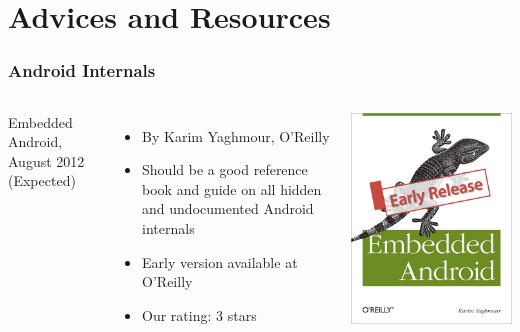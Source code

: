 \section{Advices and Resources}

\begin{frame}
  \frametitle{Android Internals}
  \begin{columns}
    Embedded Android, August 2012 (Expected)
    \begin{itemize}
    \item By Karim Yaghmour, O'Reilly
    \item Should be a good reference book and guide on all hidden and
      undocumented Android internals
    \item Early version available at O'Reilly
    \item Our rating: 3 stars
    \end{itemize}
    \includegraphics[width=\textwidth]{slides/android-resources/embedded-android.jpg}
  \end{columns}
\end{frame}

